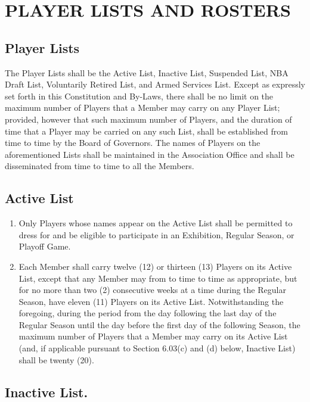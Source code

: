 \documentclass[]{book}
\providecommand{\tightlist}{%
  \setlength{\itemsep}{0pt}\setlength{\parskip}{0pt}}
\theoremstyle{definition}
\theoremstyle{definition}
\theoremstyle{definition}
\theoremstyle{remark}
\begin{document}
\section{PLAYER LISTS AND ROSTERS}\label{player-lists-and-rosters}

\subsection{Player Lists}\label{player-lists}

The Player Lists shall be the Active List, Inactive List, Suspended
List, NBA Draft List, Voluntarily Retired List, and Armed Services List.
Except as expressly set forth in this Constitution and By-Laws, there
shall be no limit on the maximum number of Players that a Member may
carry on any Player List; provided, however that such maximum number of
Players, and the duration of time that a Player may be carried on any
such List, shall be established from time to time by the Board of
Governors. The names of Players on the aforementioned Lists shall be
maintained in the Association Office and shall be disseminated from time
to time to all the Members.

\subsection{Active List}\label{active-list}

\begin{enumerate}
\def\labelenumi{(\alph{enumi})}
\tightlist
\item
  Only Players whose names appear on the Active List shall be permitted
  to dress for and be eligible to participate in an Exhibition, Regular
  Season, or Playoff Game.
\item
  Each Member shall carry twelve (12) or thirteen (13) Players on its
  Active List, except that any Member may from to time to time as
  appropriate, but for no more than two (2) consecutive weeks at a time
  during the Regular Season, have eleven (11) Players on its Active
  List. Notwithstanding the foregoing, during the period from the day
  following the last day of the Regular Season until the day before the
  first day of the following Season, the maximum number of Players that
  a Member may carry on its Active List (and, if applicable pursuant to
  Section 6.03(c) and (d) below, Inactive List) shall be twenty (20).
\end{enumerate}

\subsection{Inactive List.}\label{inactive-list.}
\end{document}
